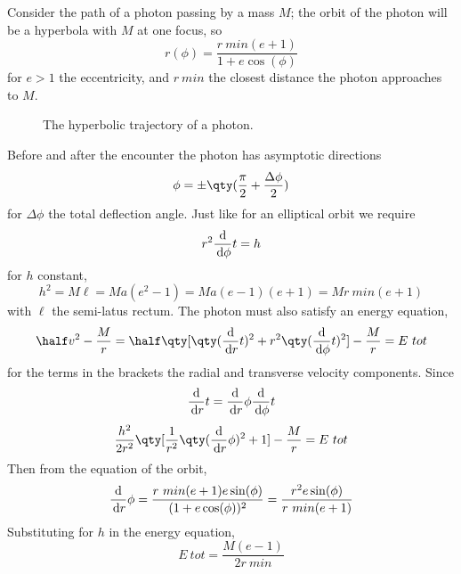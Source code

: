Consider the path of a photon passing by a mass $M$; the orbit of the
photon will be a hyperbola with $M$ at one focus, so
\[ r(\phi) = \frac{ r~{min} (e+1) }{1+e \cos(\phi) } \] for $e>1$ the
eccentricity, and $r~{min}$ the closest distance the photon approaches
to $M$.
\begin{figure}[t] \centering
{}
\caption{The hyperbolic trajectory of a photon.}
\end{figure}
Before and after the encounter the photon has asymptotic directions
\begin{equation}
  \label{eq:161}
  \phi = \pm \qty( \frac{\pi}{2} + \frac{\Delta \phi}{2})
\end{equation}
for $\Delta \phi$ the total deflection angle. Just like for an
elliptical orbit we require \[ r^2 \frac{\mathrm{d}}{\,\mathrm{d} \phi}{t} = h \] for $h$ constant,
\[ h^2 = M \ell = Ma (e^2 - 1) = Ma (e-1)(e+1) = M r~{min}(e+1) \]
with $\ell$ the semi-latus rectum.
The photon must also satisfy an energy equation,
\begin{equation}
  \label{eq:162}
  \half v^2 - \frac{M}{r} = \half \qty[ \qty( \dv{r}{t} )^2 + r^2 \qty( \dv{\phi}{t} )^2 ] - \frac{M}{r} = E~{tot}
\end{equation}
for the terms in the brackets the radial and transverse velocity
components. Since 
\[ \frac{\mathrm{d}}{\,\mathrm{d} r}{t} = \frac{\mathrm{d}}{\,\mathrm{d} r}{\phi} \frac{\mathrm{d}}{\,\mathrm{d} \phi}{t} \]
\begin{equation}
  \label{eq:163}
  \frac{h^2}{2r^2} \qty[ \frac{1}{r^2} \qty(\dv{r}{\phi})^2 + 1] - \frac{M}{r} = E~{tot}
\end{equation}
Then from the equation of the orbit,
\begin{equation}
  \label{eq:164}
  \frac{\mathrm{d}}{\,\mathrm{d} r}{\phi} = \frac{r~{min}(e+1)e \sin(\phi)}{(1+e \cos(\phi))^2} = \frac{r^2 e \sin(\phi)}{r~{min} (e+1)}
\end{equation}
Substituting for $h$ in the energy equation,
\begin{equation}
  \label{eq:165}
  E~{tot} = \frac{M(e-1)}{2 r~{min}}
\end{equation}
